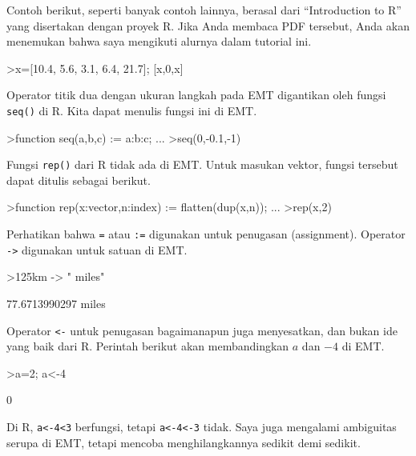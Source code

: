 \documentclass[a4paper,11pt,oneside,enabledeprecatedfontcommands]{scrbook}
\newenvironment{eulernotebook}{}{}
\newenvironment{eulercomment}{\par\medskip\noindent}{\par\medskip}
\begin{document}
\begin{eulernotebook}
\begin{eulercomment}
			Contoh berikut, seperti banyak contoh lainnya, berasal dari ``Introduction to R'' yang disertakan
			dengan proyek R. Jika Anda membaca PDF tersebut, Anda akan menemukan bahwa saya mengikuti alurnya
			dalam tutorial ini.
		\end{eulercomment}
		\begin{eulerprompt}
			>x=[10.4, 5.6, 3.1, 6.4, 21.7]; [x,0,x]
		\end{eulerprompt}
		\begin{euleroutput}
			[10.4,  5.6,  3.1,  6.4,  21.7,  0,  10.4,  5.6,  3.1,  6.4,  21.7]
		\end{euleroutput}
		\begin{eulercomment}
			Operator titik dua dengan ukuran langkah pada EMT digantikan oleh fungsi \texttt{seq()} di R. Kita dapat
			menulis fungsi ini di EMT.
		\end{eulercomment}
		\begin{eulerprompt}
			>function seq(a,b,c) := a:b:c; ...
			>seq(0,-0.1,-1)
		\end{eulerprompt}
		\begin{euleroutput}
			[0,  -0.1,  -0.2,  -0.3,  -0.4,  -0.5,  -0.6,  -0.7,  -0.8,  -0.9,  -1]
		\end{euleroutput}
		\begin{eulercomment}
			Fungsi \texttt{rep()} dari R tidak ada di EMT. Untuk masukan vektor, fungsi tersebut dapat ditulis sebagai
			berikut.
		\end{eulercomment}
		\begin{eulerprompt}
			>function rep(x:vector,n:index) := flatten(dup(x,n)); ...
			>rep(x,2)
		\end{eulerprompt}
		\begin{euleroutput}
			[10.4,  5.6,  3.1,  6.4,  21.7,  10.4,  5.6,  3.1,  6.4,  21.7]
		\end{euleroutput}
		\begin{eulercomment}
			Perhatikan bahwa \texttt{=} atau \texttt{:=} digunakan untuk penugasan (assignment). Operator \texttt{->} digunakan untuk
			satuan di EMT.
		\end{eulercomment}
		\begin{eulerprompt}
			>125km -> " miles"
		\end{eulerprompt}
		\begin{euleroutput}
			77.6713990297 miles
		\end{euleroutput}
		\begin{eulercomment}
			Operator \texttt{<-} untuk penugasan bagaimanapun juga menyesatkan, dan bukan ide yang baik dari R. Perintah
			berikut akan membandingkan $a$ dan $-4$ di EMT.
		\end{eulercomment}
		\begin{eulerprompt}
			>a=2; a<-4
		\end{eulerprompt}
		\begin{euleroutput}
			0
		\end{euleroutput}
		\begin{eulercomment}
			Di R, \texttt{a<-4<3} berfungsi, tetapi \texttt{a<-4<-3} tidak. Saya juga mengalami ambiguitas serupa di EMT,
			tetapi mencoba menghilangkannya sedikit demi sedikit.
			

\end{eulercomment}
\end{eulernotebook}
\end{document}
